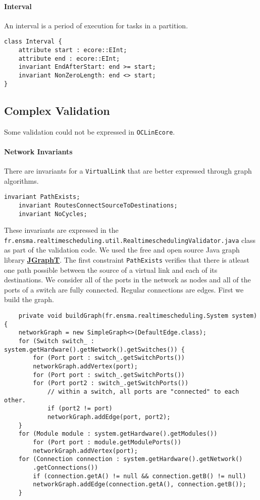 \paragraph{Interval}
An interval is a period of execution for tasks in a partition.
\begin{lstlisting}[caption=Interval constraints]
class Interval {
    attribute start : ecore::EInt;
    attribute end : ecore::EInt;
    invariant EndAfterStart: end >= start;
    invariant NonZeroLength: end <> start;
}
\end{lstlisting}
\subsection{Complex Validation}
Some validation could not be expressed in \texttt{OCLinEcore}.
\paragraph{Network Invariants} There are invariants for a \texttt{VirtualLink}
that are better expressed through graph algorithms.
\begin{lstlisting}[caption=VirtualLink graph invariants]
    invariant PathExists;
    invariant RoutesConnectSourceToDestinations;
    invariant NoCycles;
\end{lstlisting}
These invariants are expressed in the \texttt{fr.ensma.realtimescheduling.util.RealtimeschedulingValidator.java}
class as part of the validation code.
We used the free and open source Java graph library \href{http://jgrapht.org/}{\textbf{JGraphT}}.
The first constraint \texttt{PathExists} verifies that there is atleast one path possible
between the source of a virtual link and each of its destinations. We consider all
of the ports in the network as nodes and all of the ports of a switch are fully connected.
Regular connections are edges.
First we build the graph.
\begin{verbatim}
    private void buildGraph(fr.ensma.realtimescheduling.System system) {
	networkGraph = new SimpleGraph<>(DefaultEdge.class); 
	for (Switch switch_ : system.getHardware().getNetwork().getSwitches()) { 
	    for (Port port : switch_.getSwitchPorts()) 
		networkGraph.addVertex(port);
	    for (Port port : switch_.getSwitchPorts()) 
		for (Port port2 : switch_.getSwitchPorts()) 
		    // within a switch, all ports are "connected" to each other.
		    if (port2 != port) 
			networkGraph.addEdge(port, port2);
	}
	for (Module module : system.getHardware().getModules()) 
	    for (Port port : module.getModulePorts()) 
		networkGraph.addVertex(port);
	for (Connection connection : system.getHardware().getNetwork()
		.getConnections()) 
	    if (connection.getA() != null && connection.getB() != null) 
		networkGraph.addEdge(connection.getA(), connection.getB());
    }
\end{verbatim}
